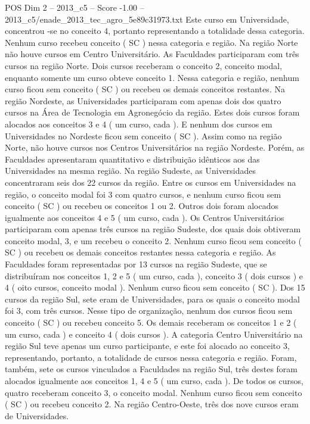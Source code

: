 \begin{textsample}{POS Dim 2 – 2013\_c5 – Score -1.00 – 2013\_c5/enade\_2013\_tec\_agro\_5e89c31973.txt}
Este curso em Universidade, concentrou -se no conceito 4, portanto representando a totalidade dessa categoria.
Nenhum curso recebeu conceito ( SC ) nessa categoria e região.
Na região Norte não houve cursos em Centro Universitário.
As Faculdades participaram com três cursos na região Norte.
Dois cursos receberam o conceito 2, conceito modal, enquanto somente um curso obteve conceito 1.
Nessa categoria e região, nenhum curso ficou sem conceito ( SC ) ou recebeu os demais conceitos restantes.
Na região Nordeste, as Universidades participaram com apenas dois dos quatro cursos na Área de Tecnologia em Agronegócio da região.
Estes dois cursos foram alocados aos conceitos 3 e 4 ( um curso, cada ).
E nenhum dos cursos em Universidades no Nordeste ficou sem conceito ( SC ).
Assim como na região Norte, não houve cursos nos Centros Universitários na região Nordeste.
Porém, as Faculdades apresentaram quantitativo e distribuição idênticos aos das Universidades na mesma região.
Na região Sudeste, as Universidades concentraram seis dos 22 cursos da região.
Entre os cursos em Universidades na região, o conceito modal foi 3 com quatro cursos, e nenhum curso ficou sem conceito ( SC ) ou recebeu os conceitos 1 ou 2.
Outros dois foram alocados igualmente aos conceitos 4 e 5 ( um curso, cada ).
Os Centros Universitários participaram com apenas três cursos na região Sudeste, dos quais dois obtiveram conceito modal, 3, e um recebeu o conceito 2.
Nenhum curso ficou sem conceito ( SC ) ou recebeu os demais conceitos restantes nessa categoria e região.
As Faculdades foram representadas por 13 cursos na região Sudeste, que se distribuíram nos conceitos 1, 2 e 5 ( um curso, cada ), conceito 3 ( dois cursos ) e 4 ( oito cursos, conceito modal ).
Nenhum curso ficou sem conceito ( SC ).
Dos 15 cursos da região Sul, sete eram de Universidades, para os quais o conceito modal foi 3, com três cursos.
Nesse tipo de organização, nenhum dos cursos ficou sem conceito ( SC ) ou recebeu conceito 5.
Os demais receberam os conceitos 1 e 2 ( um curso, cada ) e conceito 4 ( dois cursos ).
A categoria Centro Universitário na região Sul teve apenas um curso participante, e este foi alocado ao conceito 3, representando, portanto, a totalidade de cursos nessa categoria e região.
Foram, também, sete os cursos vinculados a Faculdades na região Sul, três destes foram alocados igualmente aos conceitos 1, 4 e 5 ( um curso, cada ).
De todos os cursos, quatro receberam conceito 3, o conceito modal.
Nenhum curso ficou sem conceito ( SC ) ou recebeu conceito 2.
Na região Centro-Oeste, três dos nove cursos eram de Universidades.

\end{textsample}
